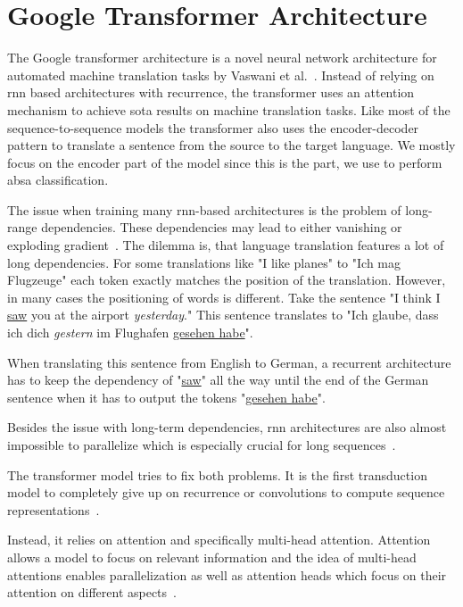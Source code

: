 \section{Google Transformer Architecture}
\label{sec:03_transformer}
The Google transformer architecture is a novel neural network architecture for automated machine translation tasks by Vaswani et al.~\cite{Vaswani2017d}. Instead of relying on \gls{rnn} based architectures with recurrence, the transformer uses an attention mechanism to achieve \gls{sota} results on machine translation tasks. Like most of the sequence-to-sequence models the transformer also uses the encoder-decoder pattern to translate a sentence from the source to the target language. We mostly focus on the encoder part of the model since this is the part, we use to perform \gls{absa} classification.
\medskip

The issue when training many \gls{rnn}-based architectures is the problem of long-range dependencies. These dependencies may lead to either vanishing or exploding gradient~\cite{Hochreiter2009}. The dilemma is, that language translation features a lot of long dependencies. For some translations like "I like planes" to "Ich mag Flugzeuge" each token exactly matches the position of the translation. However, in many cases the positioning of words is different. Take the sentence "I think I \underline{saw} you at the airport \emph{yesterday}." This sentence translates to "Ich glaube, dass ich dich \emph{gestern} im Flughafen \underline{gesehen habe}".

When translating this sentence from English to German, a recurrent architecture has to keep the dependency of "\underline{saw}" all the way until the end of the German sentence when it has to output the tokens "\underline{gesehen habe}".
\medskip

Besides the issue with long-term dependencies, \gls{rnn} architectures are also almost impossible to parallelize which is especially crucial for long sequences~\cite{Vaswani2017d}.
\medskip

The transformer model tries to fix both problems. It is the first transduction model to completely give up on recurrence or convolutions to compute sequence representations~\cite{Vaswani2017d}. 

Instead, it relies on attention and specifically multi-head attention. Attention allows a model to focus on relevant information and the idea of multi-head attentions enables parallelization as well as attention heads which focus on their attention on different aspects~\cite{Vaswani2017d}.

